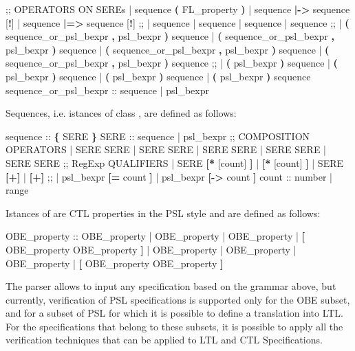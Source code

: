 \begin{Grammar}
 ;; OPERATORS ON SEREs
 | sequence \textbf{(} FL_property \textbf{)}
 | sequence \textbf{|->} sequence [\textbf{!}]
 | sequence \textbf{|=>} sequence [\textbf{!}]
 ;;
 |  sequence
 |  sequence
 |  sequence
 |  sequence
 ;;
 |  \textbf{(} sequence_or_psl_bexpr \textbf{,} psl_bexpr \textbf{)} sequence
 |  \textbf{(} sequence_or_psl_bexpr \textbf{,} psl_bexpr \textbf{)} sequence
 |  \textbf{(} sequence_or_psl_bexpr \textbf{,} psl_bexpr \textbf{)} sequence
 |  \textbf{(} sequence_or_psl_bexpr \textbf{,} psl_bexpr \textbf{)} sequence
 ;;
 |  \textbf{(} psl_bexpr \textbf{)} sequence
 |  \textbf{(} psl_bexpr \textbf{)} sequence
 |  \textbf{(} psl_bexpr \textbf{)} sequence
 |  \textbf{(} psl_bexpr \textbf{)} sequence
sequence_or_psl_bexpr ::
   sequence
 | psl_bexpr
\end{Grammar}
%
Sequences, i.e. istances of class , are defined as follows:
%
\begin{Grammar}
sequence ::
   \textbf{\{} SERE \textbf{\}}
SERE ::
   sequence
 | psl_bexpr
 ;; COMPOSITION OPERATORS
 | SERE \operator{;} SERE
 | SERE \operator{:} SERE
 | SERE \operator{&} SERE
 | SERE \operator{&&} SERE
 | SERE \operator{|} SERE
 ;; RegExp QUALIFIERS
 | SERE \textbf{[*} [count] \textbf{]}
 | \textbf{[*} [count] \textbf{]}
 | SERE \textbf{[+]}
 | \textbf{[+]}
 ;;
 | psl_bexpr \textbf{[=} count \textbf{]}
 | psl_bexpr \textbf{[->} count \textbf{]}
count ::
   number
 | range
\end{Grammar}
%
Istances of  are CTL properties in the PSL style
and are defined as follows:
%
\begin{Grammar}
OBE_property ::
    OBE_property
 |  OBE_property
 |  OBE_property
 |  \textbf{[} OBE_property  OBE_property \textbf{]}
 |  OBE_property
 |  OBE_property
 |  OBE_property
 |  \textbf{[} OBE_property  OBE_property \textbf{]}
\end{Grammar}
%
The \nusmv parser allows to input any specification based on the
grammar above, but currently, verification of PSL specifications is
supported only for the OBE subset, and for a subset of PSL for
which it is possible to define a translation into LTL. For the
specifications that belong to these subsets, it is possible to apply
all the verification techniques that can be applied to LTL and CTL
Specifications.


